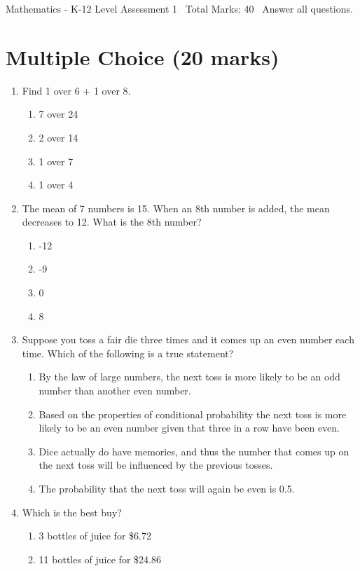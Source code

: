 \documentclass[12pt]{article}
\begin{document}
\begin{center}
Mathematics - K-12 Level Assessment 1 \
Total Marks: 40 \
Answer all questions.
\end{center}

\section*{Multiple Choice (20 marks)}
\begin{enumerate}[label=\arabic*.]
\item Find 1 over 6 + 1 over 8.
\begin{enumerate}[label=(\alph*)]
    \item 7 over 24
    \item 2 over 14
    \item 1 over 7
    \item 1 over 4
\end{enumerate}
\item The mean of 7 numbers is 15. When an 8th number is added, the mean decreases to 12. What is the 8th number?
\begin{enumerate}[label=(\alph*)]
    \item -12
    \item -9
    \item 0
    \item 8
\end{enumerate}
\item Suppose you toss a fair die three times and it comes up an even number each time. Which of the following is a true statement?
\begin{enumerate}[label=(\alph*)]
    \item By the law of large numbers, the next toss is more likely to be an odd number than another even number.
    \item Based on the properties of conditional probability the next toss is more likely to be an even number given that three in a row have been even.
    \item Dice actually do have memories, and thus the number that comes up on the next toss will be influenced by the previous tosses.
    \item The probability that the next toss will again be even is 0.5.
\end{enumerate}
\item Which is the best buy?
\begin{enumerate}[label=(\alph*)]
    \item 3 bottles of juice for \$6.72
    \item 11 bottles of juice for \$24.86

\end{enumerate}
\end{enumerate}
\end{document}
